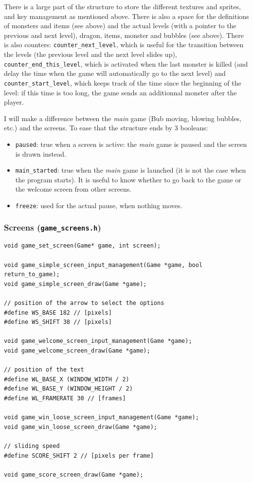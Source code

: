 \documentclass[12pt,a4paper]{article}
\newcommand{\cc}[1]{\texttt{#1}}
\begin{document}
There is a large part of the structure to store the different textures and sprites, and key management as mentioned above. There is also a space for the definitions of monsters and items (see above) and the actual levels (with a pointer to the previous and next level), dragon, items, monster and bubbles (see above). There is also counters: \cc{counter_next_level}, which is useful for the transition between the levels (the previous level and the next level slides up), \cc{counter_end_this_level}, which is activated when the last monster is killed (and delay the time when the game will automatically go to the next level) and \cc{counter_start_level}, which keeps track of the time since the beginning of the level: if this time is too long, the game sends an additionnal monster after the player.

I will make a difference between the \textit{main} game (Bub moving, blowing bubbles, etc.) and the screens. To ease that the structure ends by 3 booleans:\begin{itemize}
\item \cc{paused}: true when a screen is active: the \textit{main} game is paused and the screen is drawn instead.
\item \cc{main_started}: true when the \textit{main} game is launched (it is not the case when the program starts). It is useful to know whether to go back to the game or the welcome screen from other screens.
\item \cc{freeze}: used for the actual pause, when nothing moves.
\end{itemize}

\subsubsection{Screens (\texttt{game\_screens.h})}

\begin{verbatim}
void game_set_screen(Game* game, int screen);

void game_simple_screen_input_management(Game *game, bool return_to_game);
void game_simple_screen_draw(Game *game);

// position of the arrow to select the options
#define WS_BASE 182 // [pixels]
#define WS_SHIFT 38 // [pixels]

void game_welcome_screen_input_management(Game *game);
void game_welcome_screen_draw(Game *game);

// position of the text
#define WL_BASE_X (WINDOW_WIDTH / 2)
#define WL_BASE_Y (WINDOW_HEIGHT / 2)
#define WL_FRAMERATE 30 // [frames]

void game_win_loose_screen_input_management(Game *game);
void game_win_loose_screen_draw(Game *game);

// sliding speed
#define SCORE_SHIFT 2 // [pixels per frame]

void game_score_screen_draw(Game *game);
\end{verbatim}
\end{document}
